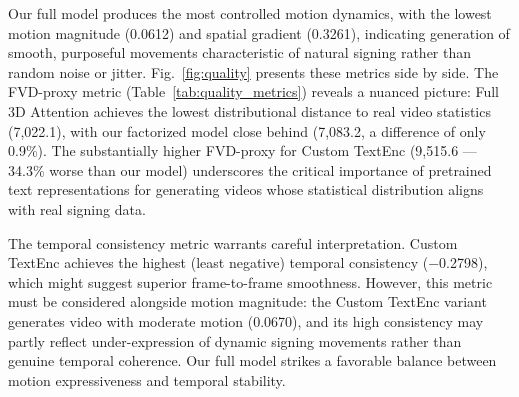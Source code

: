 \documentclass{ieeeaccess}
\begin{document}
\begin{table}[H]
    \centering
    \caption{Generation Quality Metrics Across Ablation Variants. \textbf{Bold} = best; \underline{underline} = second best.}
    \label{tab:quality_metrics}
    \renewcommand{\arraystretch}{1.15}
\end{table}

Our full model produces the most controlled motion dynamics, with the lowest motion magnitude (0.0612) and spatial gradient (0.3261), indicating generation of smooth, purposeful movements characteristic of natural signing rather than random noise or jitter. Fig.~\ref{fig:quality} presents these metrics side by side. The FVD-proxy metric (Table~\ref{tab:quality_metrics}) reveals a nuanced picture: Full 3D Attention achieves the lowest distributional distance to real video statistics (7{,}022.1), with our factorized model close behind (7{,}083.2, a difference of only 0.9\%). The substantially higher FVD-proxy for Custom TextEnc (9{,}515.6 — 34.3\% worse than our model) underscores the critical importance of pretrained text representations for generating videos whose statistical distribution aligns with real signing data.

The temporal consistency metric warrants careful interpretation. Custom TextEnc achieves the highest (least negative) temporal consistency ($-$0.2798), which might suggest superior frame-to-frame smoothness. However, this metric must be considered alongside motion magnitude: the Custom TextEnc variant generates video with moderate motion (0.0670), and its high consistency may partly reflect under-expression of dynamic signing movements rather than genuine temporal coherence. Our full model strikes a favorable balance between motion expressiveness and temporal stability.
\end{document}
